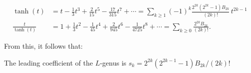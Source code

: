 \begin{equation}\label{eq:tanh_series}
	\begin{aligned}
		\tanh(t) &= t - \frac{1}{3}t^3 + \frac{2}{15}t^5 - \frac{17}{315}t^7+\cdots = \sum_{k\geq 1} (-1)^k\frac{2^{2k}(2^{2k}-1)B_{2k}}{(2k)!}\, t^{2k-1}\\
		\frac{t}{\tanh(t)} &= 1+\frac{1}{3}t^2-\frac{1}{45}t^4+\frac{2}{945}t^6 - \frac{1}{4725}t^8 +\cdots = \sum_{k\geq 0}\frac{2^{2k}B_{2k}}{(2k)!}.
	\end{aligned}
\end{equation}

From this, it follows that:

\begin{proposition}\label{prop:leading_coefficient_L_genus}
	The leading coefficient of the $L$-genus is $s_k=2^{2k}(2^{2k-1}-1)B_{2k}/(2k)!$
\end{proposition}
